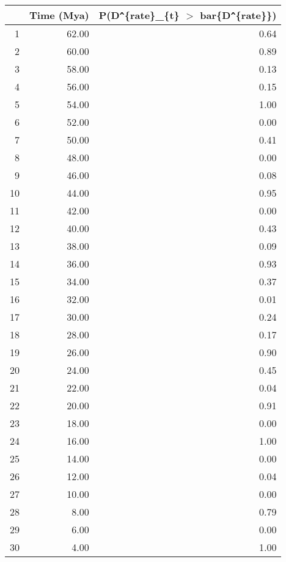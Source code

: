\begin{table}[ht]
\centering
\begin{tabular}{rrr}
  \hline
 & Time (Mya) & P(D\verb|^|\{rate\}\_\{t\} $>$ bar\{D\verb|^|\{rate\}\}) \\ 
  \hline
1 & 62.00 & 0.64 \\ 
  2 & 60.00 & 0.89 \\ 
  3 & 58.00 & 0.13 \\ 
  4 & 56.00 & 0.15 \\ 
  5 & 54.00 & 1.00 \\ 
  6 & 52.00 & 0.00 \\ 
  7 & 50.00 & 0.41 \\ 
  8 & 48.00 & 0.00 \\ 
  9 & 46.00 & 0.08 \\ 
  10 & 44.00 & 0.95 \\ 
  11 & 42.00 & 0.00 \\ 
  12 & 40.00 & 0.43 \\ 
  13 & 38.00 & 0.09 \\ 
  14 & 36.00 & 0.93 \\ 
  15 & 34.00 & 0.37 \\ 
  16 & 32.00 & 0.01 \\ 
  17 & 30.00 & 0.24 \\ 
  18 & 28.00 & 0.17 \\ 
  19 & 26.00 & 0.90 \\ 
  20 & 24.00 & 0.45 \\ 
  21 & 22.00 & 0.04 \\ 
  22 & 20.00 & 0.91 \\ 
  23 & 18.00 & 0.00 \\ 
  24 & 16.00 & 1.00 \\ 
  25 & 14.00 & 0.00 \\ 
  26 & 12.00 & 0.04 \\ 
  27 & 10.00 & 0.00 \\ 
  28 & 8.00 & 0.79 \\ 
  29 & 6.00 & 0.00 \\ 
  30 & 4.00 & 1.00 \\ 
   \hline
\end{tabular}
\label{tab:rate_peak}
\end{table}
